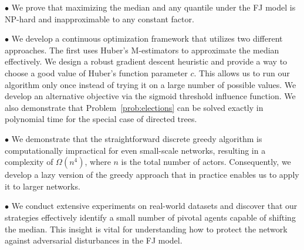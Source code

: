 $\bullet$
We prove that maximizing the median and any quantile under the FJ model is NP-hard and inapproximable to any constant factor.   

$\bullet$
We develop a continuous optimization framework that  utilizes two different approaches. The first uses Huber's M-estimators to approximate the median effectively. We design a robust gradient descent heuristic and provide a way to choose a good value of Huber's function parameter $c$. This allows us to run our algorithm only once instead of trying it on a large number of possible values.     
We develop an alternative objective via the sigmoid threshold influence function. We also demonstrate that Problem~\ref{prob:elections} can be solved exactly in polynomial time for the
special case of directed trees.

$\bullet$
We demonstrate that the straightforward discrete greedy algorithm is computationally impractical for even small-scale networks, resulting in a complexity of $\Omega(n^4)$, where $n$ is the total number of actors. Consequently, we develop a lazy version of the greedy approach that in practice enables us to apply it to larger networks.
    
$\bullet$
We conduct extensive experiments on real-world datasets and discover that our strategies effectively identify a small number of pivotal agents capable of shifting the median. This insight is vital for understanding how to protect the network against adversarial disturbances in the FJ model. 


